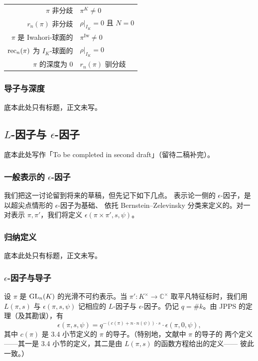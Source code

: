 \begin{center}
\renewcommand{\arraystretch}{1.35}
\begin{tabular}{@{}r@{\qquad$\Longleftrightarrow$\qquad}l@{}}
$\pi$ 非分歧 & $\pi^{K}\neq 0$\\
$r_n(\pi)$ 非分歧 & $\rho|_{I_K}=0$ 且 $N=0$\\
$\pi$ 是 Iwahori-球面的 & $\pi^{\mathrm{Iw}}\neq 0$\\
$\mathrm{rec}_n(\pi)$ 为 $I_K$-球面的 & $\rho|_{I_K}=0$\\
$\pi$ 的深度为 $0$ & $r_n(\pi)$ 驯分歧
\end{tabular}
\end{center}

\subsubsection{导子与深度}

底本此处只有标题，正文未写。

\subsection{$L$-因子与 $\epsilon$-因子}

底本此处写作「To be completed in second draft」（留待二稿补完）。

\subsubsection{一般表示的 $\epsilon$-因子}

我们把这一讨论留到将来的草稿，但先记下如下几点。
表示论一侧的 $\epsilon$-因子，是以超尖点情形的 $\epsilon$-因子为基础、
依托 Bernstein--Zelevinsky 分类来定义的。对一对表示 $\pi,\pi'$，我们将定义
$\epsilon(\pi\times\pi',s,\psi)$。

\subsubsection{归纳定义}

底本此处只有标题，正文未写。

\subsubsection{$\epsilon$-因子与导子}

设 $\pi$ 是 $\mathrm{GL}_n(K)$ 的光滑不可约表示。当 $\pi'\colon K^{\times}\to\mathbb{C}^{\times}$
取平凡特征标时，我们用 $L(\pi,s)$ 与 $\epsilon(\pi,s,\psi)$ 记相应的 $L$-因子与
$\epsilon$-因子。仍记 $q=\#k$。由 JPPS 的定理（及其勘误），有
\[
\epsilon(\pi,s,\psi)=q^{-\left(c(\pi)+n\cdot n(\psi)\right)\cdot s}\cdot
\epsilon(\pi,0,\psi),
\]
其中 $c(\pi)$ 是 3.4 小节定义的 $\pi$ 的导子。（特别地，文献中 $\pi$ 的导子的
两个定义——其一是 3.4 小节的定义，其二是由 $L(\pi,s)$ 的函数方程给出的定义——
彼此一致。）

